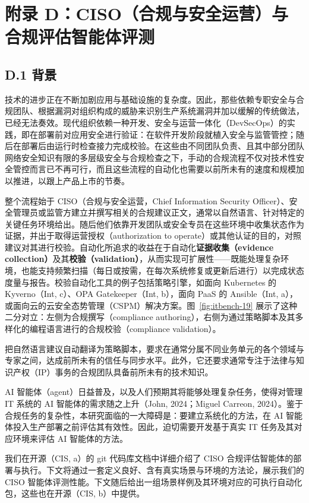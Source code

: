 \section{附录 D：CISO（合规与安全运营）与合规评估智能体评测}

\subsection{D.1 背景}

技术的进步正在不断加剧应用与基础设施的复杂度。因此，那些依赖专职安全与合规团队、根据漏洞对组织构成的威胁来识别生产系统漏洞并加以缓解的传统做法，已经无法奏效。现代组织依赖一种开发、安全与运营一体化（DevSecOps）的实践，即在部署前对应用安全进行验证：在软件开发阶段就植入安全与监管管控；随后在部署后由运行时检查接力完成校验。在这些由不同团队负责、且其中部分团队网络安全知识有限的多层级安全与合规检查之下，手动的合规流程不仅对技术性安全管控而言已不再可行，而且这些流程的自动化也需要以前所未有的速度和规模加以推进，以跟上产品上市的节奏。

整个流程始于 CISO（合规与安全运营，Chief Information Security Officer）、安全管理员或监管方建立并撰写相关的合规建议正文，通常以自然语言、针对特定的关键任务环境给出。随后他们依靠开发团队或安全专员在这些环境中收集状态作为证据，并出于取得运营授权（authorization to operate）或其他认证的目的，对照建议对其进行校验。自动化所追求的收益在于自动化\textbf{证据收集（evidence collection）}及其\textbf{校验（validation）}，从而实现可扩展性——既能处理复杂环境，也能支持频繁扫描（每日或按需，在每次系统修复或更新后进行）以完成状态度量与报告。校验自动化工具的例子包括策略引擎，如面向 Kubernetes 的 Kyverno（Int, c）、OPA Gatekeeper（Int, b），面向 PaaS 的 Ansible（Int, a），或面向云的云安全态势管理（CSPM）解决方案。图~\ref{fig:itbench-19} 展示了这种二分对立：左侧为合规撰写（compliance authoring），右侧为通过策略脚本及其多样化的编程语言进行的合规校验（compliance validation）。

把自然语言建议自动翻译为策略脚本，要求在通常分属不同业务单元的各个领域与专家之间，达成前所未有的信任与同步水平。此外，它还要求通常专注于法律与知识产权（IP）事务的合规团队具备前所未有的技术知识。

AI 智能体（agent）日益普及，以及人们预期其将能够处理复杂任务，使得对管理 IT 系统的 AI 智能体的需求随之上升（John, 2024；Miguel Carreon, 2024）。鉴于合规任务的复杂性，本研究面临的一大障碍是：要建立系统化的方法，在 AI 智能体投入生产部署之前评估其有效性。因此，迫切需要开发基于真实 IT 任务及其对应环境来评估 AI 智能体的方法。

我们在开源（CIS, a）的 git 代码库文档中详细介绍了 CISO 合规评估智能体的部署与执行。下文将通过一套定义良好、含有真实场景与环境的方法论，展示我们的 CISO 智能体评测性能。下文随后给出一组场景样例及其环境对应的可执行自动化包，这些也在开源（CIS, b）中提供。

